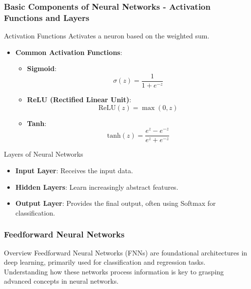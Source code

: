 \documentclass[aspectratio=169]{beamer}
\begin{document}
\begin{frame}[fragile]
  \frametitle{Basic Components of Neural Networks - Activation Functions and Layers}
  \begin{block}{Activation Functions}
      Activates a neuron based on the weighted sum.
  \end{block}
  
  \begin{itemize}
      \item \textbf{Common Activation Functions}:
          \begin{itemize}
              \item \textbf{Sigmoid}:
              \[
                  \sigma(z) = \frac{1}{1 + e^{-z}}
              \]
              
              \item \textbf{ReLU (Rectified Linear Unit)}:
              \[
                  \text{ReLU}(z) = \max(0, z)
              \]
              
              \item \textbf{Tanh}:
              \[
                  \text{tanh}(z) = \frac{e^{z} - e^{-z}}{e^{z} + e^{-z}}
              \]
          \end{itemize}
  \end{itemize}
  
  \begin{block}{Layers of Neural Networks}
      \begin{itemize}
          \item \textbf{Input Layer}: Receives the input data.
          \item \textbf{Hidden Layers}: Learn increasingly abstract features.
          \item \textbf{Output Layer}: Provides the final output, often using Softmax for classification.
      \end{itemize}
  \end{block}
\end{frame}

\begin{frame}[fragile]
    \frametitle{Feedforward Neural Networks}
    \begin{block}{Overview}
        Feedforward Neural Networks (FNNs) are foundational architectures in deep learning, primarily used for classification and regression tasks.
        Understanding how these networks process information is key to grasping advanced concepts in neural networks.
    \end{block}
\end{frame}
\end{document}

